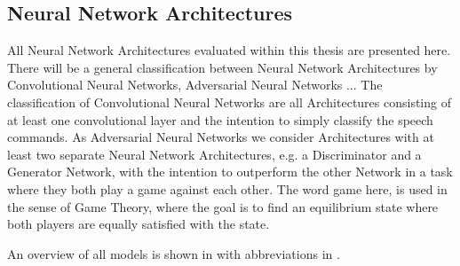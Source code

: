 \subsection{Neural Network Architectures}\label{sec:nn_arch}
All Neural Network Architectures evaluated within this thesis are presented here.
There will be a general classification between Neural Network Architectures by Convolutional Neural Networks, Adversarial Neural Networks ...
The classification of Convolutional Neural Networks are all Architectures consisting of at least one convolutional layer and the intention to simply classify the speech commands.
As Adversarial Neural Networks we consider Architectures with at least two separate Neural Network Architectures, e.g. a Discriminator and a Generator Network, with the intention to outperform the other Network in a task where they both play a game against each other.
The word game here, is used in the sense of Game Theory, where the goal is to find an equilibrium state where both players are equally satisfied with the state.

An overview of all models is shown in  with abbreviations in .

